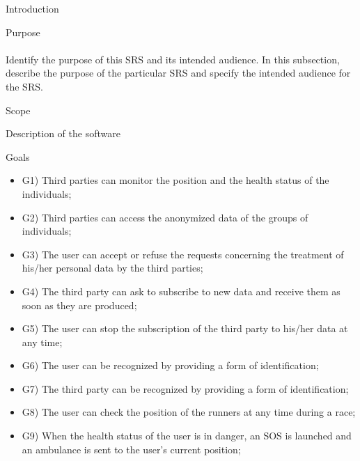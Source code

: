 \documentclass{article}
\begin{document}
\newpage
	\begin{legal}\bfseries
 	\item Introduction \\
  		\begin{legal}
    		\item Purpose\\
		\\
		{\normalfont
		Identify the purpose of this SRS and its intended audience. In this subsection, describe the purpose of the particular SRS and specify the intended audience for the SRS.
		}
		\item Scope\\
			\begin{legal}
    			\item Description of the software \\
			\item Goals \\
			{\normalfont
				\begin{itemize}
				\item G1) Third parties can monitor the position and the health status of the individuals;\\
				\item G2) Third parties can access the anonymized data of the groups of individuals;\\
				\item G3) The user can accept or refuse the requests concerning the treatment of his/her personal data by the third parties;\\
				\item G4) The third party can ask to subscribe to new data and receive them as soon as they are produced;\\
				\item G5) The user can stop the subscription of the third party to his/her data at any time;\\
				\item G6) The user can be recognized by providing a form of identification;\\
				\item G7) The third party can be recognized by providing a form of identification;\\
				\item G8) The user can check the position of the runners at any time during a race;\\
				\item G9) When the health status of the user is in danger, an SOS is launched and an ambulance is sent to the user’s current position;\\

\end{itemize}}
\end{legal}
\end{legal}
\end{legal}
\end{document}
